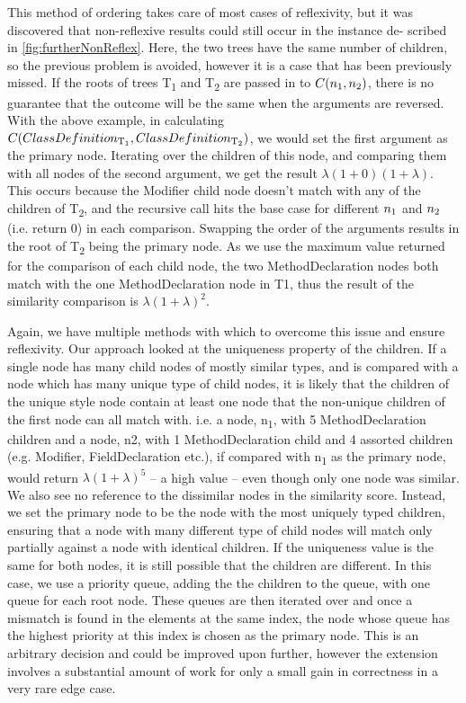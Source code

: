 This method of ordering takes care of most cases of reflexivity, but it
was discovered that non-reflexive results could still occur in the instance de-
scribed in \ref{fig:furtherNonReflex}. Here, the two trees have the same number of children, so the
previous problem is avoided, however it is a case that has been previously
missed. If the roots of trees T\textsubscript{1} and T\textsubscript{2} are passed in
 to $C(n\textsubscript{1},n\textsubscript{2})$, there
is no guarantee that the outcome will be the same when the arguments are reversed. With the above example, in calculating $C(ClassDefinition\textsubscript{T\textsubscript{1}},ClassDefinition\textsubscript{T\textsubscript{2}})$, we would set the first argument as the primary node. Iterating over the
children of this node, and comparing them with all nodes of the second argument, 
we get the result $\lambda(1 + 0)(1 + \lambda)$. This occurs because the Modifier
child node doesn’t match with any of the children of T\textsubscript{2}, and the recursive
call hits the base case for different $n\textsubscript{1}$ and $n\textsubscript{2}$ (i.e. return 0) in each 
comparison. Swapping the order of the arguments results in the root of T\textsubscript{2} being the
primary node. As we use the maximum value returned for the comparison
of each child node, the two MethodDeclaration nodes both match with the one MethodDeclaration node in T1, thus the result of the similarity comparison is $\lambda(1 + \lambda)^2$.

Again, we have multiple methods with which to overcome this issue and ensure reflexivity. Our approach looked at the uniqueness property of the children. If a single node has many child nodes of mostly similar types, and is compared with a node which has many unique type of child nodes, it is likely that the children of the unique style node contain at least one node that the non-unique children of the first node can all match with. i.e. a node, n\textsubscript{1}, with 5 MethodDeclaration children and a node, n2, with 1 MethodDeclaration child and 4 assorted children (e.g. Modifier, FieldDeclaration etc.), if compared with n\textsubscript{1} as the primary node, would return $\lambda(1 + \lambda)^5$ -- a high value -- even though only one node was similar. We also see no reference to the dissimilar nodes in the similarity score. Instead, we set the primary node to be the node with the most uniquely typed children, ensuring that a node with many different type of child nodes will match only partially against a node with identical children.
If the uniqueness value is the same for both nodes, it is still possible that the children are different. In this case, we use a priority queue, adding the the children to the queue, with one queue for each root node. These queues are then iterated over and once a mismatch is found in the elements at the same index, the node whose queue has the highest priority at this index is chosen as the primary node. This is an arbitrary decision and could be improved upon further, however
the extension involves a substantial amount of work for only a small gain in correctness in a
very rare edge case.

